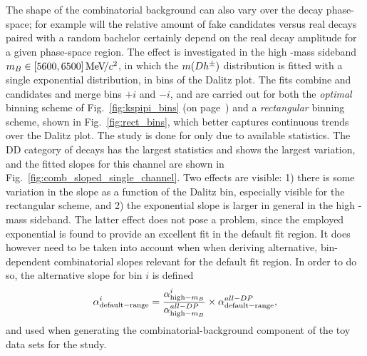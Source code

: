 The shape of the combinatorial background can also vary over the \D decay phase-space; for example will the relative amount of fake \D candidates versus real \D decays paired with a random bachelor certainly depend on the real \D decay amplitude for a given phase-space region. The effect is investigated in the high \B-mass sideband $m_{B}\in[5600, 6500]\text{\,Me\kern -0.1em V\!/}c^2$, in which the $m({D} h^\pm)$ distribution is fitted with a single exponential distribution, in bins of the Dalitz plot. The fits combine \Bp and \Bm candidates and merge bins $+i$ and $-i$, and are carried out for both the \emph{optimal} binning scheme of Fig.~\ref{fig:kspipi_bins} (on page~\pageref{fig:kspipi_bins}) and a \emph{rectangular} binning scheme, shown in Fig.~\ref{fig:rect_bins}, which better captures continuous trends over the Dalitz plot. The study is done for \DtoKspipi only due to available statistics. The DD category of \BtoDpi decays has the largest statistics and shows the largest variation, and the fitted slopes for this channel are shown in Fig.~\ref{fig:comb_sloped_single_channel}. Two effects are visible: 1) there is some variation in the slope as a function of the Dalitz bin, especially visible for the rectangular scheme, and 2) the exponential slope is larger in general in the high \B-mass sideband. The latter effect does not pose a problem, since the employed exponential is found to provide an excellent fit in the default fit region. It does however need to be taken into account when when deriving alternative, bin-dependent combinatorial slopes relevant for the default fit region. In order to do so, the alternative slope for bin $i$ is defined
\begin{align}
    \alpha^i_\mathrm{default-range} = \frac{\alpha^i_{\mathrm{high-}m_{B}}}{\alpha^{all-DP}_{\mathrm{high-}m_{B}}}\times \alpha^{all-DP}_\mathrm{default-range},
\end{align}
and used when generating the combinatorial-background component of the toy data sets for the study.


